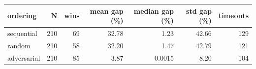 \begin{tabular}{lrrrrrr}
\hline
ordering & N & wins & mean gap (\%) & median gap (\%) & std gap (\%) & timeouts \\
\hline
sequential & 210 & 69 & 32.78 & 1.23 & 42.66 & 129 \\
random & 210 & 58 & 32.20 & 1.47 & 42.79 & 121 \\
adversarial & 210 & 85 & 3.87 & 0.0015 & 8.20 & 104 \\
\hline
\end{tabular}
